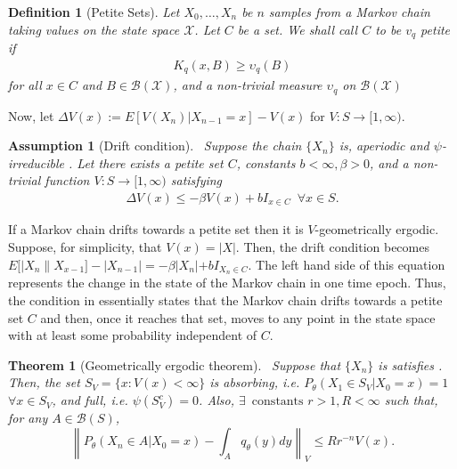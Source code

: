 \documentclass[11pt]{amsart}
\newcommand{\data}{X_0,\dots,X_n}
\newcommand{\psirr}{$\psi$-irreducible }
\newtheorem{defn}{Definition}[section]
\newtheorem{theorem}{Theorem}[section]
\newtheorem{assumption}{Assumption}[section]
\begin{document}
\begin{defn}[{Petite Sets}] Let $\data$ be $n$ samples from a Markov chain taking values on the state space $\mathcal{X}$. Let $C$ be a set. We shall call $C$ to be $v_q$ petite if 
\begin{align*}
    K_q(x,B)\geq \upsilon_q(B)
\end{align*}
for all $x\in C$ and $B\in \mathcal{B(X)}$, and a non-trivial measure $\upsilon_q$ on $\mathcal{B(X)}$ 
\end{defn}

Now, let $\Delta V(x):=E[V(X_n)|X_{n-1}=x]-V(x)$ for $V : S \to [1,\infty)$.

\begin{assumption}[{Drift condition}]~\label{assume:drift} Suppose the chain $\{X_n\}$ is, aperiodic and \psirr. Let there exists a petite set $C$, constants $b<\infty, \beta>0$, and a non-trivial function $V : S \to [1,\infty)$ satisfying
\begin{align}
    \Delta V(x)\leq -\beta V(x) + bI_{x\in C}\enspace \forall x \in S.
\end{align}
\end{assumption}
If a Markov chain drifts towards a petite set then it is $V$-geometrically ergodic. Suppose, for simplicity, that $V(x)=|X|$. Then, the drift condition becomes $E[|X_n\|X_{x-1}]-|X_{n-1}|=-\beta |X_n|+bI_{X_n\in C}$. The left hand side of this equation represents the change in the state of the Markov chain in one time epoch. Thus, the condition in  essentially states that the Markov chain drifts towards a petite set $C$ and then, once it reaches that set, moves to any point in the state space with at least some probability independent of $C$. 

\begin{theorem}[{Geometrically ergodic theorem}]~\label{theorem:v-geom}
  Suppose that $\{X_n\}$ is satisfies . Then, the set $S_V=\{x:V(x)<\infty\}$ is absorbing, i.e. $P_\theta(X_1\in S_V|X_0=x)=1$ $\forall x\in S_V$, and full, i.e. $\psi(S_V^c)=0$. Also, $\exists\enspace \text{constants }r>1, R<\infty$ such that, for any $A \in \mathcal{B}(S)$,
  \begin{equation}
      \left\|P_\theta(X_n \in A | X_0=x)- \int_A q_\theta(y) dy \right\|_V \leq R r^{-n}V(x).
  \end{equation}
\end{theorem}
\end{document}
